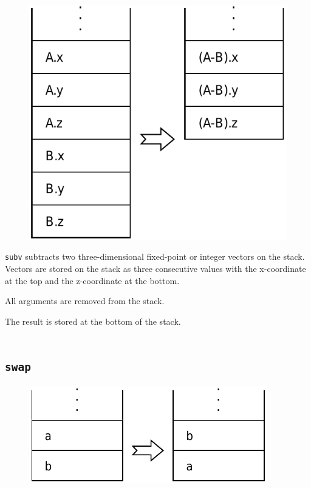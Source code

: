 		\begin{figure}
			\begin{flushright}
				\includegraphics[width=\linewidth]{figure/pdf/i_subv} 
			\end{flushright}
		\end{figure}
	
			\texttt{subv} subtracts two three-dimensional fixed-point or
			integer vectors on the stack. Vectors are stored on the stack as
			three consecutive values with the x-coordinate at the top and the
			z-coordinate at the bottom.
			
			All arguments are removed from the stack.
			
			The result is stored at the bottom of the stack.\\\\
	
	\qquad\qquad 
	
	\subsection*{\texttt{swap}}
	
		\begin{figure}
			\begin{flushright}
				\includegraphics[width=\linewidth]{figure/pdf/i_swap} 
			\end{flushright}
		\end{figure}
	
